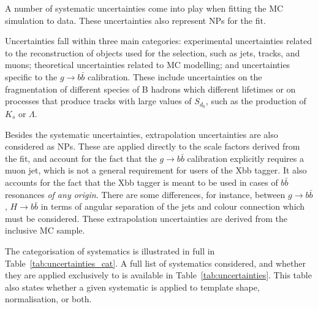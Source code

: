\documentclass[10pt,a4paper]{book}
\begin{document}
A number of systematic uncertainties come into play when fitting the MC simulation to data. These uncertainties also represent NPs for the fit.

Uncertainties fall within three main categories: experimental uncertainties related to the reconstruction of objects used for the selection, such as jets, tracks, and muons; theoretical uncertainties related to MC modelling; and uncertainties specific to the $g\rightarrow b\bar{b}$ calibration. These include uncertainties on the fragmentation of different species of B hadrons which different lifetimes or on processes that produce tracks with large values of $S_{d_0}$, such as the production of $K_s$ or $\Lambda$.

Besides the systematic uncertainties, extrapolation uncertainties are also considered as NPs. These are applied directly to the scale factors derived from the fit, and account for the fact that the $g\rightarrow b\bar{b}$ calibration explicitly requires a muon jet, which is not a general requirement for users of the Xbb tagger. It also accounts for the fact that the Xbb tagger is meant to be used in cases of $b\bar{b}$ resonances \emph{of any origin}. There are some differences, for instance, between $g\rightarrow b\bar{b}$, $H\rightarrow b\bar{b}$ in terms of angular separation of the jets and colour connection which must be considered. These extrapolation uncertainties are derived from the inclusive MC sample.

The categorisation of systematics is illustrated in full in Table~\ref{tab:uncertainties_cat}. A full list of systematics considered, and whether they are applied exclusively to is available in Table~\ref{tab:uncertainties}. This table also states whether a given systematic is applied to template shape, normalisation, or both. 
\end{document}
